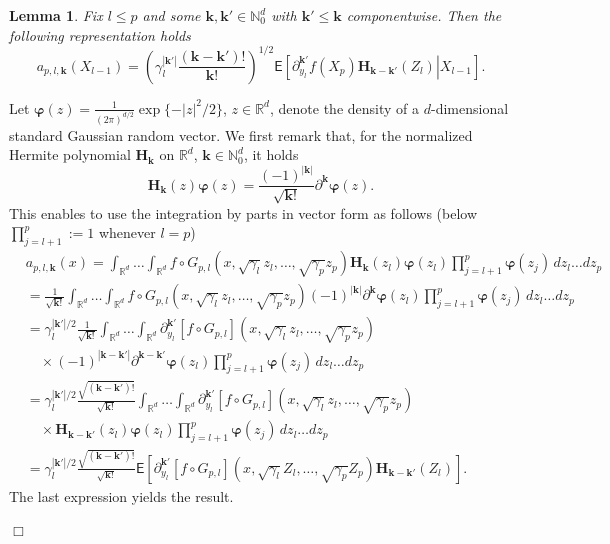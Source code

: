 \documentclass[preprint]{imsart}
\newcommand{\proofendsign}{$\Box$}
\newtheorem{lem}[thm]{Lemma}
\newenvironment{proof}{{\noindent \bf Proof }}
 {{\hspace*{\fill}\proofendsign\par\bigskip}}
\begin{document}
\begin{lem}\label{eq:a_repr}
Fix $l\le p$ and some \(\mathbf{k},\mathbf{k}'\in \mathbb{N}_0^d\) with \(\mathbf{k}'\le \mathbf{k}\) componentwise.  Then the following representation holds
$$
a_{p,l,\mathbf{k}}(X_{l-1})=\left(\gamma_{l}^{|\mathbf{k}'|}\frac{(\mathbf{k}-\mathbf{k}') !}{\mathbf{k}!}\right)^{1/2}
\mathsf E\left[\left.
\partial_{y_l}^{\mathbf{k}'}f(X_p)\mathbf{H}_{\mathbf{k}-\mathbf{k}'}(Z_l)\right|X_{l-1}\right].
$$
\end{lem}

\begin{proof}
Let $\boldsymbol{\varphi}(z)=\frac{1}{(2\pi)^{d/2}} \exp\{-|z|^2/2\}$,
$z\in\mathbb R^d$, denote the density of a $d$-dimensional
standard Gaussian random vector.
We first remark that, for the normalized Hermite polynomial $\mathbf H_{\mathbf k}$ on $\mathbb R^d$,
$\mathbf k\in\mathbb N_0^d$, it holds
$$
\mathbf{H}_{\mathbf{k}}(z)\boldsymbol{\varphi}(z)
=\frac{(-1)^{|\mathbf{k}|}}{\sqrt{\mathbf{k} !}} \partial^{\mathbf{k}} \boldsymbol{\varphi}(z).
$$
This enables to use the integration by parts in vector form as follows
(below $\prod_{j=l+1}^p:=1$ whenever $l=p$)
\begin{align*}
&a_{p,l,\mathbf k}(x)
 =
\int_{\mathbb R^d}\ldots\int_{\mathbb R^d}
f\circ G_{p,l}(x,\sqrt{\gamma_{l}}z_{l},\ldots,\sqrt{\gamma_{p}}z_{p})
\mathbf{H}_{\mathbf{k}}(z_{l})\boldsymbol{\varphi}(z_l)
\prod_{j=l+1}^p\boldsymbol{\varphi}(z_j)\, dz_{l}\ldots dz_{p}
\\
& =
\frac{1}{\sqrt{\mathbf k!}}
\int_{\mathbb R^d}\ldots\int_{\mathbb R^d}
f\circ G_{p,l}(x,\sqrt{\gamma_{l}}z_{l},\ldots,\sqrt{\gamma_{p}}z_{p})
(-1)^{|\mathbf{k}|}\partial^{\mathbf{k}} \boldsymbol{\varphi}(z_l)
\prod_{j=l+1}^p\boldsymbol{\varphi}(z_j)\, dz_{l}\ldots dz_{p}
\\
& =
\gamma_l^{|\mathbf k'|/2}\frac{1}{\sqrt{\mathbf k!}}
\int_{\mathbb R^d}\ldots\int_{\mathbb R^d}
\partial_{y_l}^{\mathbf k'}[f\circ G_{p,l}](x,\sqrt{\gamma_{l}}z_{l},\ldots,\sqrt{\gamma_{p}}z_{p})
\\
&\hspace{1em}\times
(-1)^{|\mathbf{k}-\mathbf k'|}\partial^{\mathbf{k}-\mathbf k'} \boldsymbol{\varphi}(z_l)
\prod_{j=l+1}^p\boldsymbol{\varphi}(z_j)\, dz_{l}\ldots dz_{p}
\\
& =
\gamma_l^{|\mathbf k'|/2}\frac{\sqrt{(\mathbf k-\mathbf k')!}}{\sqrt{\mathbf k!}}
\int_{\mathbb R^d}\ldots\int_{\mathbb R^d}
\partial_{y_l}^{\mathbf k'}[f\circ G_{p,l}](x,\sqrt{\gamma_{l}}z_{l},\ldots,\sqrt{\gamma_{p}}z_{p})
\\
&\hspace{1em}\times
\mathbf{H}_{\mathbf{k}-\mathbf k'}(z_{l})\boldsymbol{\varphi}(z_l)
\prod_{j=l+1}^p\boldsymbol{\varphi}(z_j)\, dz_{l}\ldots dz_{p}
\\
 & =\gamma_{l}^{|\mathbf{k}'|/2}\frac{\sqrt{(\mathbf{k}-\mathbf{k}')!}}{\sqrt{\mathbf{k}!}}\mathsf{E}\left[\partial_{y_{l}}^{\mathbf{k}'}[f\circ G_{p,l}](x,\sqrt{\gamma_{l}}Z_{l},\ldots,\sqrt{\gamma_{p}}Z_{p})\mathbf{H}_{\mathbf{k}-\mathbf{k}'}(Z_{l})\right].
\end{align*}
The last expression yields the result.
\end{proof}
\end{document}
